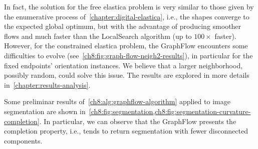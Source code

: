 In fact, the solution for the free elastica problem is very similar to those given by the enumerative process of~\cref{chapter:digital-elastica}, i.e., the shapes converge to the expected global optimum, but with the advantage of producing smoother flows and much faster than the LocalSearch algorithm (up to $100 \times$ faster). However, for the constrained elastica problem, the GraphFlow encounters some difficulties to evolve (see~\cref{ch8:fig:graph-flow-neigh2-results}), in particular for the fixed endpoints' orientation instances. We believe that a larger neighborhood, possibly random, could solve this issue. The results are explored in more details in~\cref{chapter:results-analysis}.

Some preliminar results of~\cref{ch8:alg:graphflow-algorithm} applied to image segmentation are shown in~\cref{ch8:fig:segmentation,ch8:fig:segmentation-curvature-completion}. In particular, we can observe that the GraphFlow presents the completion property, i.e., tends to return segmentation with fewer disconnected components.


